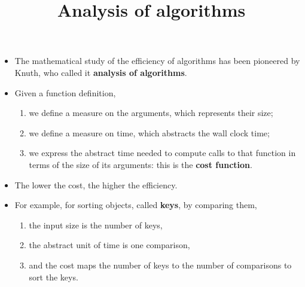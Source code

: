 \documentclass[wide]{slides}
\begin{document}
\begin{slide}
  \title{Analysis of algorithms}

  \begin{itemize}

    \item The mathematical study of the efficiency of algorithms has
      been pioneered by Knuth, who called it \textbf{analysis of
        algorithms}.

    \item Given a function definition,
      \begin{enumerate}

        \item we define a measure on the arguments, which represents
          their size;

        \item we define a measure on time, which abstracts the wall
          clock time;

        \item we express the abstract time needed to compute calls to
          that function in terms of the size of its arguments: this is
          the \textbf{cost function}.

      \end{enumerate}

    \item The lower the cost, the higher the efficiency.

    \item For example, for sorting objects, called \textbf{keys}, by
      comparing them,
      \begin{enumerate}

        \item the input size is the number of keys,

        \item the abstract unit of time is one comparison,

        \item and the cost maps the number of keys to the number of
          comparisons to sort the keys.

      \end{enumerate}

  \end{itemize}

\end{slide}
\end{document}
